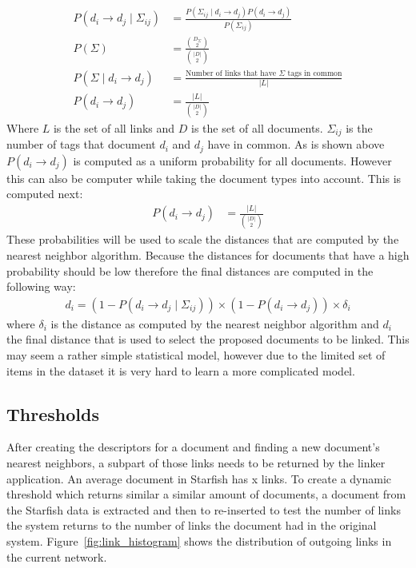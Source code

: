 \begin{align}
  P(d_i \to d_j \mid \Sigma_{ij}) &= \frac{P(\Sigma_{ij} \mid d_i \to d_j)P(d_i \to d_j)}{P(\Sigma_{ij})} \\
  P(\Sigma) &= \frac{{D_\Sigma \choose 2}}{{|D| \choose 2}} \\ 
  P(\Sigma \mid d_i \to d_j) &= \frac{\textrm{Number of links that have $\Sigma$ tags in common}}{|L|} \\
  P(d_i \to d_j) &= \frac{|L|}{{|D| \choose 2}}
\end{align}
Where $L$ is the set of all links and $D$ is the set of all documents.
$\Sigma_{ij}$ is the number of tags that document $d_i$ and $d_j$ have in
common. As is shown above $P(d_i \to d_j)$ is computed as a uniform probability
for all documents. However this can also be computer while taking the document
types into account. This is computed next:
\begin{align}
  P(d_i \to d_j) &= \frac{|L|}{{|D| \choose 2}}
\end{align}
These probabilities will be used to scale the distances that are
computed by the nearest neighbor algorithm. Because the distances for documents
that have a high probability should be low therefore the final distances are
computed in the following way:
\begin{align}
  d_i = (1 - P(d_i\to d_j \mid \Sigma_{ij})) \times (1-P(d_i \to d_j)) \times \delta_i
\end{align}
where $\delta_i$ is the distance as computed by the nearest neighbor algorithm
and $d_i$ the final distance that is used to select the proposed documents to
be linked. This may seem a rather simple statistical model, however due to the
limited set of items in the dataset it is very hard to learn a more complicated
model.

\subsection{Thresholds}
After creating the descriptors for a document and finding a new document's
nearest neighbors, a subpart of those links needs to be returned by the linker
application. An average document in Starfish has x links. To create a dynamic
threshold which returns similar a similar amount of documents, a document from
the Starfish data is extracted and then to re-inserted to test the number of
links the system returns to the number of links the document had in the
original system. Figure~\ref{fig:link_histogram} shows the distribution of
outgoing links in the current network.

